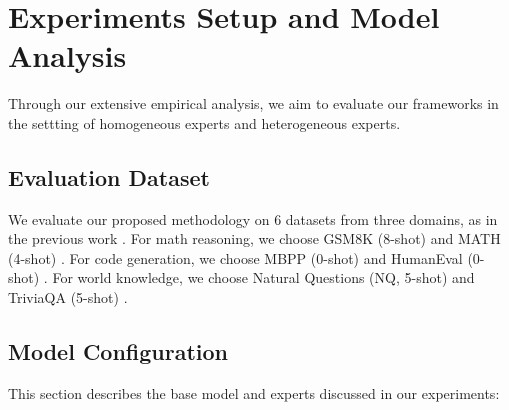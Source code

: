 \section{Experiments Setup and Model Analysis}
\label{sec:experiments}
Through our extensive empirical analysis, we aim to evaluate our frameworks in the settting of homogeneous experts and heterogeneous experts.

\subsection{Evaluation Dataset}
We evaluate our proposed methodology on 6 datasets from three domains, as in the previous work \cite{sukhbaatar2024branchtrainmixmixingexpertllms}. For math reasoning, we choose GSM8K (8-shot) and MATH (4-shot) \cite{cobbe2021training, hendrycks2021measuring}. For code generation, we choose MBPP (0-shot) and HumanEval (0-shot) \cite{chen2021evaluating, austin2021program}. For world knowledge, we choose Natural Questions (NQ, 5-shot) and TriviaQA (5-shot) \cite{kwiatkowski2019natural, joshi2017triviaqa}.

\subsection{Model Configuration}
\label{sec:model_pretraining}
This section describes the base model and experts discussed in our experiments:

